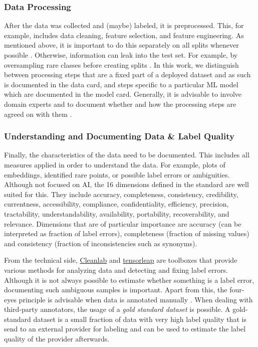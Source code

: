 \subsubsection{Data Processing}
\label{subsec:data_processing}
After the data was collected and (maybe) labeled, it is preprocessed. This, for example, includes data cleaning, feature selection, and feature engineering. As mentioned above, it is important to do this separately on all splits whenever possible \citep{Lones2021_AvoidMLPitfalls, poretschkin2021_IAIS_Leitfaden}. Otherwise, information can leak into the test set. For example, by oversampling rare classes before creating splits \citep{winter2021_TueV_Austria}.  
In this work, we distinguish between processing steps that are a fixed part of a deployed dataset and as such is documented in the data card,
and steps specific to a particular \ac{ML} model which are documented in the model card. Generally, it is advisable to involve domain experts and to document whether and how the processing steps are agreed on with them \citep{poretschkin2021_IAIS_Leitfaden}. 


\subsubsection{Understanding and Documenting Data \& Label Quality}
\label{subsec:data_quality}
Finally, the characteristics of the data need to be documented.
This includes all measures applied in order to understand the data. For example, plots of embeddings, identified rare points, or possible label errors or ambiguities. Although not focused on AI, the 16 dimensions defined in the \cite{ISO25012} standard are well suited for this. They include accuracy, completeness, consistency, credibility, currentness, accessibility, compliance, confidentiality, efficiency, precision, tractability, understandability, availability, portability, recoverability, and relevance. Dimensions that are of particular importance are accuracy (can be interpreted as fraction of label errors), completeness (fraction of missing values) and consistency (fraction of inconsistencies such as synonyms).
 
From the technical side, \href{https://cleanlab.ai/}{Cleanlab} \citep{Northcutt2021_LabelErrors} and \href{https://tensorleap.ai/}{tensorleap} are toolboxes that provide various methods for analyzing data and detecting and fixing label errors. Although it is not always possible to estimate whether something is a label error, documenting such ambiguous samples is important. Apart from this, the four-eyes principle is advisable when data is annotated manually \citep{poretschkin2021_IAIS_Leitfaden}. 
When dealing with third-party annotators, the usage of a \emph{gold standard dataset} is possible.
A gold-standard dataset is a small fraction of data with very high label quality that is send to an external provider for labeling and can be used to estimate the label quality of the provider afterwards. 

